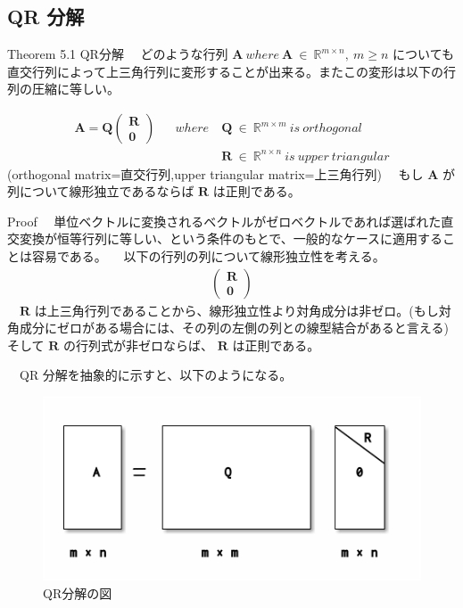 \documentclass[a4paper,10pt]{jarticle}
\begin{document}
\subsection{QR 分解}
\label{sec:org8f0f31f}
\begin{itembox}[l]{Theorem 5.1 QR分解}
　どのような行列 $\bm{A}\ where\ \bm{A}\ \in\ \mathbb{R}^{m\times n},\ m \geq n$ についても直交行列によって上三角行列に変形することが出来る。またこの変形は以下の行列の圧縮に等しい。

\begin{align*}
\bm{A} = \bm{Q}
\begin{pmatrix}
\bm{R}\\
\bm{0}
\end{pmatrix}&& where\ &\bm{Q}\ \in\ \mathbb{R}^{m\times m}\ is\ orthogonal \\
             &&& \bm{R}\ \in\ \mathbb{R}^{n\times n}\ is\ upper\ triangular
\end{align*}
(orthogonal matrix=直交行列,upper triangular matrix=上三角行列)
　もし $\bm{A}$ が列について線形独立であるならば $\bm{R}$ は正則である。
\end{itembox}
\begin{itembox}[l]{Proof}
　単位ベクトルに変換されるベクトルがゼロベクトルであれば選ばれた直交変換が恒等行列に等しい、という条件のもとで、一般的なケースに適用することは容易である。
　以下の行列の列について線形独立性を考える。
\begin{align*}
\begin{pmatrix}
\bm{R} \\
\bm{0}
\end{pmatrix}
\end{align*}
　$\bm{R}$ は上三角行列であることから、線形独立性より対角成分は非ゼロ。(もし対角成分にゼロがある場合には、その列の左側の列との線型結合があると言える) そして $\bm{R}$ の行列式が非ゼロならば、 $\bm{R}$ は正則である。
\end{itembox}

　QR 分解を抽象的に示すと、以下のようになる。\\
\begin{figure}[htbp]
\centering
\includegraphics[width=.9\linewidth]{../chapter5/figure5-1.png}
\caption{QR分解の図}
\end{figure}
\end{document}
